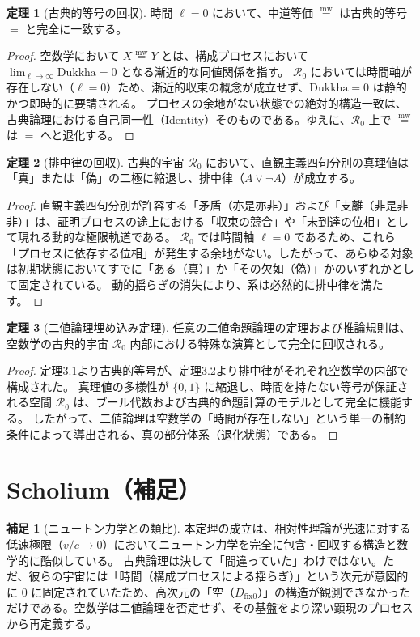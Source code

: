 \documentclass[11pt,a4paper]{article}
\newcommand{\mweq}{\mathrel{\overset{\mathrm{mw}}{=}}}
\newcommand{\dfix}{D_{\mathrm{fix}0}}
\newcommand{\Dukkha}{\mathrm{Dukkha}}
\newcommand{\Rep}{\mathcal{R}}
\theoremstyle{definition}
\newtheorem{theorem}{定理}[section]
\newtheorem{scholium}{補足}[section]
\begin{document}
\begin{theorem}[古典的等号の回収]
時間 $\ell=0$ において、中道等価 $\mweq$ は古典的等号 $=$ と完全に一致する。
\end{theorem}

\begin{proof}
空数学において $X \mweq Y$ とは、構成プロセスにおいて $\lim_{\ell \to \infty} \Dukkha = 0$ となる漸近的な同値関係を指す。
$\Rep_0$ においては時間軸が存在しない（$\ell = 0$）ため、漸近的収束の概念が成立せず、$\Dukkha = 0$ は静的かつ即時的に要請される。
プロセスの余地がない状態での絶対的構造一致は、古典論理における自己同一性（Identity）そのものである。ゆえに、$\Rep_0$ 上で $\mweq$ は $=$ へと退化する。
\end{proof}

\begin{theorem}[排中律の回収]
古典的宇宙 $\Rep_0$ において、直観主義四句分別の真理値は「真」または「偽」の二極に縮退し、排中律（$A \lor \neg A$）が成立する。
\end{theorem}

\begin{proof}
直観主義四句分別が許容する「矛盾（亦是亦非）」および「支離（非是非非）」は、証明プロセスの途上における「収束の競合」や「未到達の位相」として現れる動的な極限軌道である。
$\Rep_0$ では時間軸 $\ell = 0$ であるため、これら「プロセスに依存する位相」が発生する余地がない。したがって、あらゆる対象は初期状態においてすでに「ある（真）」か「その欠如（偽）」かのいずれかとして固定されている。
動的揺らぎの消失により、系は必然的に排中律を満たす。
\end{proof}

\begin{theorem}[二値論理埋め込み定理]
任意の二値命題論理の定理および推論規則は、空数学の古典的宇宙 $\Rep_0$ 内部における特殊な演算として完全に回収される。
\end{theorem}

\begin{proof}
定理3.1より古典的等号が、定理3.2より排中律がそれぞれ空数学の内部で構成された。
真理値の多様性が $\{0, 1\}$ に縮退し、時間を持たない等号が保証される空間 $\Rep_0$ は、ブール代数および古典的命題計算のモデルとして完全に機能する。
したがって、二値論理は空数学の「時間が存在しない」という単一の制約条件によって導出される、真の部分体系（退化状態）である。
\end{proof}

\section{Scholium（補足）}

\begin{scholium}[ニュートン力学との類比]
本定理の成立は、相対性理論が光速に対する低速極限（$v/c \to 0$）においてニュートン力学を完全に包含・回収する構造と数学的に酷似している。
古典論理は決して「間違っていた」わけではない。ただ、彼らの宇宙には「時間（構成プロセスによる揺らぎ）」という次元が意図的に $0$ に固定されていたため、高次元の「空（$\dfix$）」の構造が観測できなかっただけである。空数学は二値論理を否定せず、その基盤をより深い顕現のプロセスから再定義する。
\end{scholium}
\end{document}

